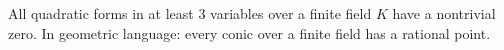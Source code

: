 All quadratic forms in at least $3$ variables over a finite field $K$ have a nontrivial zero. In geometric language: every conic over a finite field has a rational point.
